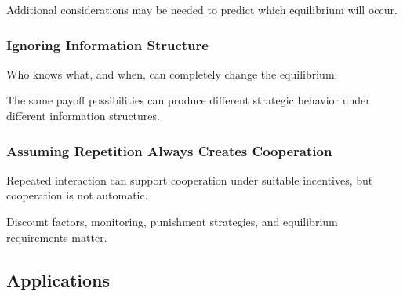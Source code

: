 Additional considerations may be needed to predict which equilibrium will
occur.

\subsubsection{Ignoring Information Structure}

Who knows what, and when, can completely change the equilibrium.

The same payoff possibilities can produce different strategic behavior
under different information structures.

\subsubsection{Assuming Repetition Always Creates Cooperation}

Repeated interaction can support cooperation under suitable incentives,
but cooperation is not automatic.

Discount factors, monitoring, punishment strategies, and equilibrium
requirements matter.

\subsection{Applications}
\label{subsec:game-theory-applications}

